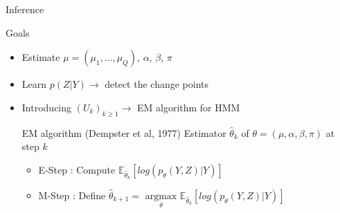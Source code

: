 \documentclass[french,english]{beamer}
\begin{document}
\begin{frame}{Inference}

\begin{block}{Goals}
    \begin{itemize}
        \item Estimate $\mu=(\mu_1, \dots, \mu_Q)$, $\alpha$, $\beta$, $\pi$
        \item Learn $p(Z\vert Y) \rightarrow$ detect the change points
    \end{itemize}
\end{block}
    \begin{itemize}
        \item Introducing $(U_k)_{k\geq 1} \rightarrow$  EM algorithm for HMM

        \begin{block}{EM algorithm (Dempster et al, 1977)}
       Estimator $\hat{\theta}_k$ of  $\theta=(\mu,\alpha,\beta,\pi)$ at step $k$
            \begin{itemize}
                \item E-Step : Compute $\mathbb{E}_{\hat{\theta}_k} [log(p_\theta(Y,Z)\vert Y)]$
                \item M-Step : Define $\hat{\theta}_{k+1}=\underset{\theta}{\textrm{ argmax }} \mathbb{E}_{\hat{\theta}_k}[log(p_\theta(Y,Z)\vert Y)]$
            \end{itemize}
        \end{block}
    
    \end{itemize}
\end{frame}
\end{document}

